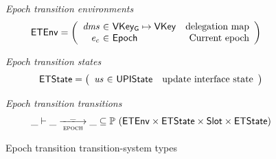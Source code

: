 \documentclass[11pt,a4paper]{article}
\newcommand{\powerset}[1]{\mathbb{P}~#1}
\newcommand{\var}[1]{\mathit{#1}}
\newcommand{\type}[1]{\mathsf{#1}}
\newcommand{\trans}[2]{\xlongrightarrow[\textsc{#1}]{#2}}
\newcommand{\Slot}{\type{Slot}}
\newcommand{\VKey}{\type{VKey}}
\newcommand{\VKeyGen}{\type{VKey_G}}
\begin{document}
\begin{figure}[ht]
  \emph{Epoch transition environments}
  \begin{align*}
    & \ETEnv
      = \left(
      \begin{array}{r@{~\in~}lr}
        \var{dms} & \VKeyGen \mapsto \VKey & \text{delegation map}\\
        \var{e_c} & \Epoch & \text{Current epoch}
      \end{array}\right)
  \end{align*}

  \emph{Epoch transition states}
  \begin{equation*}
    \ETState =
    \left(
      \begin{array}{r@{~\in~}lr}
        \var{us} & \UPIState & \text{update interface state}
      \end{array}
    \right)
  \end{equation*}

  \emph{Epoch transition transitions}
  \begin{equation*}
    \_ \vdash \var{\_} \trans{epoch}{\_} \var{\_} \subseteq
    \powerset (\ETEnv \times \ETState \times \Slot \times \ETState)
  \end{equation*}
  \caption{Epoch transition transition-system types}
  \label{fig:ts-types:epoch}
\end{figure}
\end{document}
